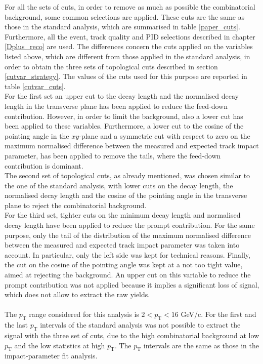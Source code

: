 \documentclass[b5paper,10pt,twoside,oldstyle,classica]{toptesi}
\newcommand{\pt}{p_\text{T}}
\begin{document}
For all the sets of cuts, in order to remove as much as possible the combinatorial background, some common selections are applied. These cuts are the same as those in the standard analysis, which are summarised in table \ref{paper_cuts}. Furthermore, all the event, track quality and PID selections described in chapter \ref{Dplus_reco} are used. The differences concern the cuts applied on the variables listed above, which are different from those applied in the  standard analysis, in order to obtain the three sets of topological cuts described in section \ref{cutvar_strategy}. The values of the cuts used for this purpose are reported in table \ref{cutvar_cuts}. \\For the first set an upper cut to the decay length and the normalised decay length in the transverse plane has been applied to reduce the feed-down contribution. However, in order to limit the background, also a lower cut has been applied to these variables. Furthermore, a lower cut to the cosine of the pointing angle in the $xy$-plane and a symmetric cut with respect to zero on the maximum normalised difference between the measured and expected track impact parameter, has been applied to remove the tails, where the feed-down contribution is dominant. \\The second set of topological cuts, as already mentioned, was chosen similar to the one of the standard analysis, with lower cuts on the decay length, the normalised decay length and the cosine of the pointing angle in the transverse plane to reject the combinatorial background. \\For the third set, tighter cuts on the minimum decay length and normalised decay length have been applied to reduce the prompt contribution. For the same purpose, only the tail of the distribution of the maximum normalised difference between the measured and expected track impact parameter was taken into account. In particular, only the left side was kept for technical reasons.  
Finally, the cut on the cosine of the pointing angle was kept at a not too tight value, aimed at rejecting the background. An upper cut on this variable to reduce the prompt contribution was not applied because it implies a significant loss of signal, which does not allow to extract the raw yields.\\\\
The $\pt$ range considered for this analysis is $2<\pt<16$ GeV/c. For the first and the last $\pt$ intervals of the standard analysis was not possible to extract the signal with the three set of cuts, due to the high combinatorial background at low $\pt$ and the low statistics at high $\pt$. The $\pt$ intervals are the same as those in the impact-parameter fit analysis. 
\end{document}
